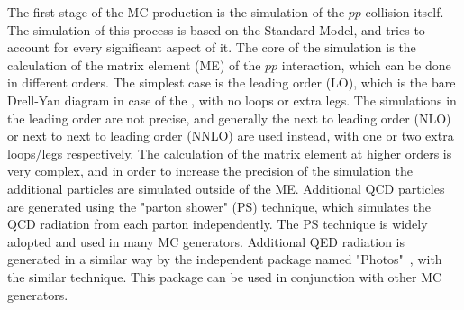 The first stage of the MC production is the simulation of the $pp$ collision itself. The simulation of this process is based on the Standard Model, and tries to account for every significant aspect of it. The core of the simulation is the calculation of the matrix element (ME) of the $pp$ interaction, which can be done in different orders. The simplest case is the leading order (LO), which is the bare Drell-Yan diagram in case of the \Zee, with no loops or extra legs. The simulations in the leading order are not precise, and generally the next to leading order (NLO) or next to next to leading order (NNLO) are used instead, with one or two extra loops/legs respectively. The calculation of the matrix element at higher orders is very complex, and in order to increase the precision of the simulation the additional particles are simulated outside of the ME. Additional QCD particles are generated using the "parton shower" (PS) technique, which simulates the QCD radiation from each parton independently. The PS technique is widely adopted and used in many MC generators. Additional QED radiation is generated in a similar way by the independent package named "Photos"~\cite{lib:photos}, with the similar technique. This package can be used in conjunction with other MC generators.

